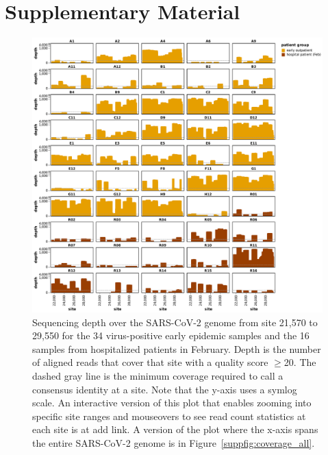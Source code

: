 \documentclass[9pt,twocolumn,twoside]{gsajnl_modified}
\begin{document}


\clearpage
\onecolumn
\renewcommand{\thepage}{S\arabic{page}}
\setcounter{page}{1}
\renewcommand{\thefigure}{S\arabic{figure}}
\setcounter{figure}{1}

\section{Supplementary Material}

\begin{figure}[h!]
\centering
\includegraphics[width=\linewidth]{figures/coverage_region.pdf}
\caption{Sequencing depth over the SARS-CoV-2 genome from site 21,570 to 29,550 for the 34 virus-positive early epidemic samples and the 16 samples from hospitalized patients in February.
Depth is the number of aligned reads that cover that site with a quality score $\ge$20.
The dashed gray line is the minimum coverage required to call a consensus identity at a site.
Note that the y-axis uses a symlog scale.
An interactive version of this plot that enables zooming into specific site ranges and mouseovers to see read count statistics at each site is at {\color{red} add link}.
A version of the plot where the x-axis spans the entire SARS-CoV-2 genome is in Figure~\ref{suppfig:coverage_all}.
}
\label{suppfig:coverage}
\end{figure}
\end{document}

